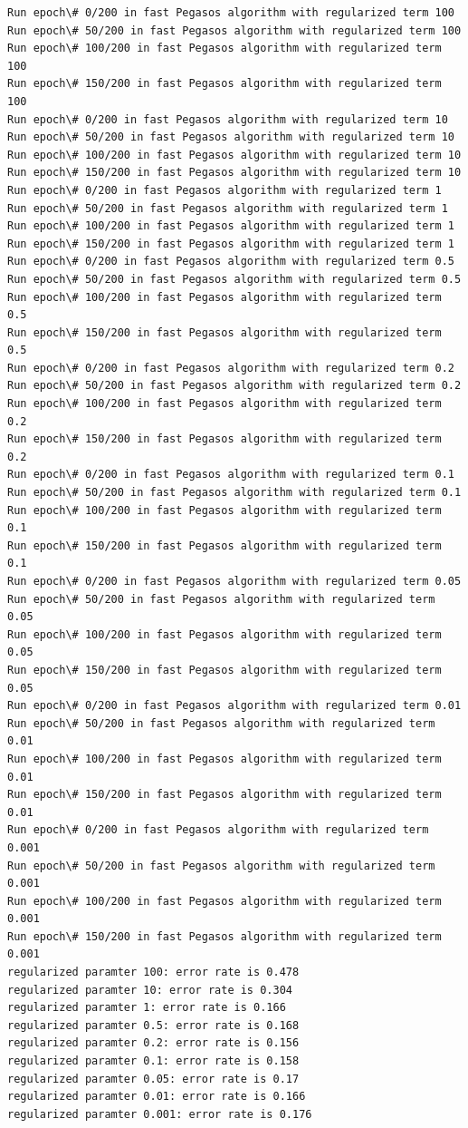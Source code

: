 \documentclass[11pt]{article}
\begin{document}
    \begin{Verbatim}[commandchars=\\\{\}]
Run epoch\# 0/200 in fast Pegasos algorithm with regularized term 100
Run epoch\# 50/200 in fast Pegasos algorithm with regularized term 100
Run epoch\# 100/200 in fast Pegasos algorithm with regularized term 100
Run epoch\# 150/200 in fast Pegasos algorithm with regularized term 100
Run epoch\# 0/200 in fast Pegasos algorithm with regularized term 10
Run epoch\# 50/200 in fast Pegasos algorithm with regularized term 10
Run epoch\# 100/200 in fast Pegasos algorithm with regularized term 10
Run epoch\# 150/200 in fast Pegasos algorithm with regularized term 10
Run epoch\# 0/200 in fast Pegasos algorithm with regularized term 1
Run epoch\# 50/200 in fast Pegasos algorithm with regularized term 1
Run epoch\# 100/200 in fast Pegasos algorithm with regularized term 1
Run epoch\# 150/200 in fast Pegasos algorithm with regularized term 1
Run epoch\# 0/200 in fast Pegasos algorithm with regularized term 0.5
Run epoch\# 50/200 in fast Pegasos algorithm with regularized term 0.5
Run epoch\# 100/200 in fast Pegasos algorithm with regularized term 0.5
Run epoch\# 150/200 in fast Pegasos algorithm with regularized term 0.5
Run epoch\# 0/200 in fast Pegasos algorithm with regularized term 0.2
Run epoch\# 50/200 in fast Pegasos algorithm with regularized term 0.2
Run epoch\# 100/200 in fast Pegasos algorithm with regularized term 0.2
Run epoch\# 150/200 in fast Pegasos algorithm with regularized term 0.2
Run epoch\# 0/200 in fast Pegasos algorithm with regularized term 0.1
Run epoch\# 50/200 in fast Pegasos algorithm with regularized term 0.1
Run epoch\# 100/200 in fast Pegasos algorithm with regularized term 0.1
Run epoch\# 150/200 in fast Pegasos algorithm with regularized term 0.1
Run epoch\# 0/200 in fast Pegasos algorithm with regularized term 0.05
Run epoch\# 50/200 in fast Pegasos algorithm with regularized term 0.05
Run epoch\# 100/200 in fast Pegasos algorithm with regularized term 0.05
Run epoch\# 150/200 in fast Pegasos algorithm with regularized term 0.05
Run epoch\# 0/200 in fast Pegasos algorithm with regularized term 0.01
Run epoch\# 50/200 in fast Pegasos algorithm with regularized term 0.01
Run epoch\# 100/200 in fast Pegasos algorithm with regularized term 0.01
Run epoch\# 150/200 in fast Pegasos algorithm with regularized term 0.01
Run epoch\# 0/200 in fast Pegasos algorithm with regularized term 0.001
Run epoch\# 50/200 in fast Pegasos algorithm with regularized term 0.001
Run epoch\# 100/200 in fast Pegasos algorithm with regularized term 0.001
Run epoch\# 150/200 in fast Pegasos algorithm with regularized term 0.001
regularized paramter 100: error rate is 0.478
regularized paramter 10: error rate is 0.304
regularized paramter 1: error rate is 0.166
regularized paramter 0.5: error rate is 0.168
regularized paramter 0.2: error rate is 0.156
regularized paramter 0.1: error rate is 0.158
regularized paramter 0.05: error rate is 0.17
regularized paramter 0.01: error rate is 0.166
regularized paramter 0.001: error rate is 0.176

    \end{Verbatim}
\end{document}

